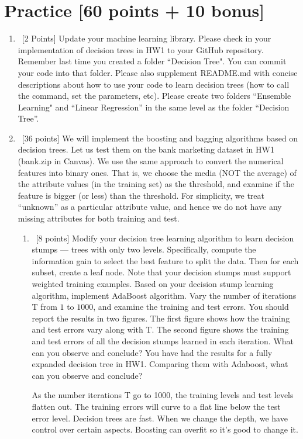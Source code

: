 \documentclass[12pt, fullpage,letterpaper]{article}
\begin{document}
\section{Practice [60 points + 10 bonus]}
\begin{enumerate}
	\item~[2 Points] Update your machine learning library. Please check in your implementation of decision trees in HW1 to your GitHub repository. Remember last time you created a folder ``Decision Tree". You can commit your code into that folder. Please also supplement README.md with concise descriptions about how to use your code to learn decision trees (how to call the command, set the parameters, etc). Please create two folders ``Ensemble Learning" and ``Linear Regression''  in the same level as the folder ``Decision Tree''.  


\item~[36 points] We will implement the boosting and bagging algorithms based on decision trees.  Let us test them on the bank marketing dataset in HW1 (bank.zip in Canvas). We use the same approach to convert the numerical features into binary ones. That is, we choose the media (NOT the average) of the attribute values (in the training set) as the threshold, and examine if the feature is bigger (or less) than the threshold.  For simplicity, we treat ``unknown'' as a particular attribute value, and hence we do not have any missing attributes for both training and test.
\begin{enumerate}
	\item~[8 points] Modify your decision tree learning algorithm to learn decision stumps ---  trees with only two levels. Specifically, compute the information gain to select the best feature to split the data. Then for each subset, create a leaf node. Note that your decision stumps must support weighted training examples. Based on your decision stump learning algorithm, implement AdaBoost algorithm. Vary the number of iterations T from $1$ to $1000$, and examine the training and test errors. You should report the results in two figures. The first figure shows how the training and test errors vary along with T. The second figure shows  the training and test errors of all the decision stumps learned in each iteration. What can you observe and conclude? You have had the results for a fully expanded decision tree in HW1. Comparing them with Adaboost, what can you observe and conclude? \newline

As the number iterations T go to 1000, the training levels and test levels flatten out. The training errors will curve to a flat line below the test error level. Decision trees are fast. When we change the depth, we have control over certain aspects. Boosting can overfit so it's good to change it. \newline
	

\end{enumerate}
\end{enumerate}
\end{document}
